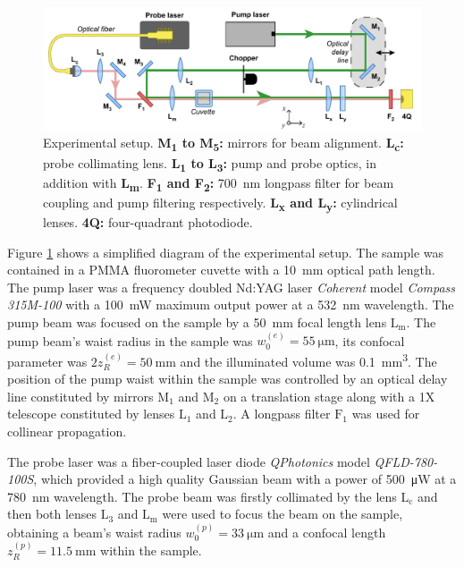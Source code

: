 \documentclass[9pt,twocolumn,twoside]{osajnl}
\newcommand{\low}[1]{\textsubscript{#1}}
\begin{document}
\begin{figure}[ht]
	\centering \includegraphics[width=\textwidth]{figures/Setup.pdf}
	\caption{Experimental setup. \textbf{M\low{1} to M\low{5}:} mirrors for beam alignment. \textbf{L\low{c}:} probe collimating lens. \textbf{L\low{1} to L\low{3}:} pump and probe optics, in addition with \textbf{L\low{m}}. \textbf{F\low{1} and F\low{2}:} \SI{700}{\nano\metre} longpass filter for beam coupling and pump filtering respectively. \textbf{L\low{x} and L\low{y}:} cylindrical lenses. \textbf{4Q:} four-quadrant photodiode.}
	\label{fig:Experimental}
\end{figure}

Figure \ref{fig:Experimental} shows a simplified diagram of the experimental setup. The sample was contained in a PMMA fluorometer cuvette with a \SI{10}{\milli\metre} optical path length. The pump laser was a frequency doubled Nd:YAG laser \emph{Coherent} model \emph{Compass 315M-100} with a \SI{100}{\milli\watt} maximum output power at a \SI{532}{\nano\metre} wavelength. The pump beam was focused on the sample by a \SI{50}{\milli\metre} focal length lens $\mathrm{L_m}$. The pump beam's waist radius in the sample was $w_0^{(e)} = \SI{55}{\micro\metre}$, its confocal parameter was $2z_R^{(e)} = \SI{50}{\milli\metre}$ and the illuminated volume was \SI{0.1}{\milli\metre^3}. The position of the pump waist within the sample was controlled by an optical delay line constituted by mirrors $\mathrm{M_1}$ and $\mathrm{M_2}$ on a translation stage along with a 1X telescope constituted by lenses $\mathrm{L_1}$ and $\mathrm{L_2}$. A longpass filter $\mathrm{F_1}$ was used for collinear propagation.

The probe laser was a fiber-coupled laser diode \emph{QPhotonics} model \emph{QFLD-780-100S}, which provided a high quality Gaussian beam with a power of \SI{500}{\micro\watt} at a \SI{780}{\nano\metre} wavelength. The probe beam was firstly collimated by the lens $\mathrm{L_c}$ and then both lenses $\mathrm{L_3}$ and $\mathrm{L_m}$ were used to focus the beam on the sample, obtaining a beam's waist radius $w_0^{(p)} = \SI{33}{\micro\metre}$ and a confocal length $z_R^{(p)} = \SI{11.5}{\milli\metre}$ within the sample. 
\end{document}
